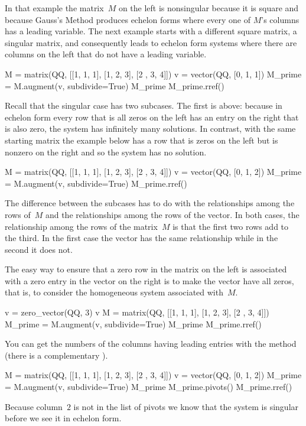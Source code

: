 In that example the matrix~$M$ on the left is nonsingular because it is 
square and because Gauss's Method produces echelon forms where every one of
$M$'s columns has a leading variable.
The next example starts with a different square matrix, a 
singular matrix, and consequently leads to 
echelon form systems where there are columns on the left 
that do not have a leading variable. 
\begin{sageoutput}
M = matrix(QQ, [[1, 1, 1], [1, 2, 3], [2 , 3, 4]])    
v = vector(QQ, [0, 1, 1]) 
M_prime = M.augment(v, subdivide=True)
M_prime
M_prime.rref()
\end{sageoutput}
\noindent
Recall that the singular case has two subcases.
The first is above: because in echelon form
every row that is all zeros on the
left has an entry on the right that is also zero,
the system has infinitely many solutions.
In contrast, with the same starting matrix
the example below has a row that is zeros on the left but is nonzero
on the right and so the system has no solution.
\begin{sageoutput}[d,0,1]
M = matrix(QQ, [[1, 1, 1], [1, 2, 3], [2 , 3, 4]])    
v = vector(QQ, [0, 1, 2])             
M_prime = M.augment(v, subdivide=True)
M_prime.rref()                        
\end{sageoutput}
\noindent
The difference between the subcases
has to do with the relationships among  
the rows of~$M$ and the relationships among the rows of the vector.
In both cases, the relationship among the rows of the matrix~$M$
is that the first two rows add to the third.
In the first case the vector has the same relationship while in the second
it does not.

The easy way to ensure that a zero row in the matrix 
on the left is associated with a zero
entry in the vector on the right is to make the vector have all zeros, that is,
to consider the homogeneous system associated with~$M$.
\begin{sageoutput}
v = zero_vector(QQ, 3)
v
M = matrix(QQ, [[1, 1, 1], [1, 2, 3], [2 , 3, 4]]) 
M_prime = M.augment(v, subdivide=True)
M_prime
M_prime.rref()
\end{sageoutput}

You can get the numbers of the columns having leading entries with 
the  method
(there is a complementary ).
\begin{sageoutput}[d,0,3]
M = matrix(QQ, [[1, 1, 1], [1, 2, 3], [2 , 3, 4]]) 
v = vector(QQ, [0, 1, 2])
M_prime = M.augment(v, subdivide=True)
M_prime                  
M_prime.pivots()         
M_prime.rref()
\end{sageoutput}
\noindent
Because column~$2$ is not in the list of pivots we know that the
system is singular before we see it in echelon form.

